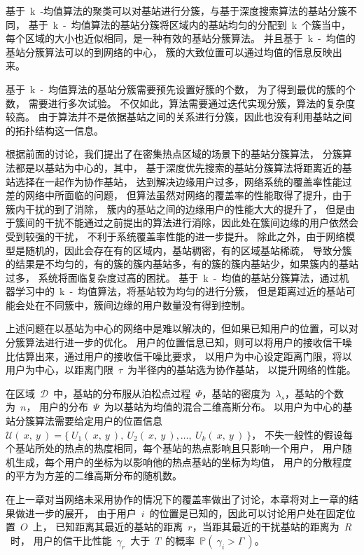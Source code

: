基于~k~-均值算法的聚类可以对基站进行分簇，与基于深度搜索算法的基站分簇不同，
基于~k~-~均值算法的基站分簇将区域内的基站均匀的分配到~k~个簇当中，
每个区域的大小也近似相同，是一种有效的基站分簇算法。
并且基于~k~-~均值的基站分簇算法可以的到网络的中心，
簇的大致位置可以通过均值的信息反映出来。

基于~k~-~均值算法的基站分簇需要预先设置好簇的个数，
为了得到最优的簇的个数，
需要进行多次试验。
不仅如此，算法需要通过迭代实现分簇，算法的复杂度较高。
由于算法并不是依据基站之间的关系进行分簇，因此也没有利用基站之间的拓扑结构这一信息。


根据前面的讨论，我们提出了在密集热点区域的场景下的基站分簇算法，
分簇算法都是以基站为中心的，其中，
基于深度优先搜索的基站分簇算法将距离近的基站选择在一起作为协作基站，
达到解决边缘用户过多，网络系统的覆盖率性能过差的网络中所面临的问题，
但算法虽然对网络的覆盖率的性能取得了提升，由于簇内干扰的到了消除，
簇内的基站之间的边缘用户的性能大大的提升了，
但是由于簇间的干扰不能通过之前提出的算法进行消除，因此处在簇间边缘的用户依然会受到较强的干扰，
不利于系统覆盖率性能的进一步提升。
除此之外，由于网络模型是随机的，因此会存在有的区域内，基站稠密，有的区域基站稀疏，
导致分簇的结果是不均匀的，有的簇的簇内基站多，有的簇的簇内基站少，如果簇内的基站过多，
系统将面临复杂度过高的困扰。
基于~k~-~均值的基站分簇算法，通过机器学习中的~k~-~均值算法，将基站较为均匀的进行分簇，
但是距离过近的基站可能会处在不同簇中，簇间边缘的用户数量没有得到控制。

上述问题在以基站为中心的网络中是难以解决的，但如果已知用户的位置，可以对分簇算法进行进一步的优化。
用户的位置信息已知，则可以将用户的接收信干噪比估算出来，通过用户的接收信干噪比要求，
以用户为中心设定距离门限，将以用户为中心，以距离门限~$\tau$~为半径内的基站选为协作基站，
以提升网络的性能。

在区域~$\mathcal{D}$~中，基站的分布服从泊松点过程~$\Phi$，基站的密度为~$\lambda_s$，基站的个数为~$n$，
用户的分布~$\Psi$~为以基站为均值的混合二维高斯分布。
以用户为中心的基站分簇算法需要给定用户的位置信息
~$\mathcal{U}(~x,~ y~)=\{~U_1(~x,~y~),~U_2(~x,~y~),\dots,~U_k(~x,~y~)~\}$，
不失一般性的假设每个基站所处的热点的热度相同，每个基站的热点影响且只影响一个用户，
用户随机生成，每个用户的坐标为以影响他的热点基站的坐标为均值，
用户的分散程度的平方为方差的二维高斯分布的随机数。

在上一章对当网络未采用协作的情况下的覆盖率做出了讨论，本章将对上一章的结果做进一步的展开，
由于用户~$i$~的位置是已知的，因此可以讨论用户处在固定位置~$O$~上，
已知距离其最近的基站的距离~$r$，当距其最近的干扰基站的距离为~$R$~时，
用户的信干比性能~$\gamma_r$~大于~$T$~的概率~$\mathbb{P}(~\gamma_i > \Gamma~)$。

